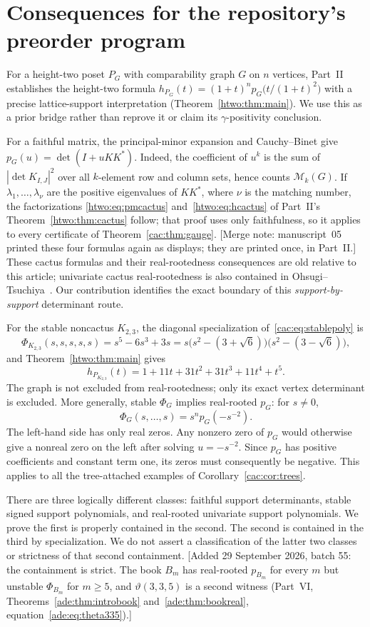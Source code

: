 \documentclass[11pt]{article}
\numberwithin{equation}{section}
\theoremstyle{definition}
\newcommand{\PM}{\mathcal M}
\begin{document}
\section{Consequences for the repository's preorder program}
\label{cac:sec:preorders}

For a height-two poset $P_G$ with comparability graph $G$ on $n$ vertices, Part~II establishes the height-two formula $h_{P_G}(t)=(1+t)^n p_G\bigl(t/(1+t)^2\bigr)$ with a precise lattice-support interpretation (Theorem~\ref{htwo:thm:main}). We use this as a prior bridge rather than reprove it or claim its $\gamma$-positivity conclusion.

For a faithful matrix, the principal-minor expansion and Cauchy--Binet give $p_G(u)=\det(I+uKK^*)$. Indeed, the coefficient of $u^k$ is the sum of $|\det K_{I,J}|^2$ over all $k$-element row and column sets, hence counts $\PM_k(G)$. If $\lambda_1,\ldots,\lambda_\nu$ are the positive eigenvalues of $KK^*$, where $\nu$ is the matching number, the factorizations \eqref{htwo:eq:pmcactus} and~\eqref{htwo:eq:hcactus} of Part~II's Theorem~\ref{htwo:thm:cactus} follow; that proof uses only faithfulness, so it applies to every certificate of Theorem~\ref{cac:thm:gauge}. [Merge note: manuscript~05 printed these four formulas again as displays; they are printed once, in Part~II.] These cactus formulas and their real-rootedness consequences are old relative to this article; univariate cactus real-rootedness is also contained in Ohsugi--Tsuchiya~\cite[Theorem 7.2]{OT21}. Our contribution identifies the exact boundary of this \emph{support-by-support} determinant route.

For the stable noncactus $K_{2,3}$, the diagonal specialization of~\eqref{cac:eq:stablepoly} is
\[
 \Phi_{K_{2,3}}(s,s,s,s,s)=s^5-6s^3+3s
 =s\bigl(s^2-(3+\sqrt6)\bigr)\bigl(s^2-(3-\sqrt6)\bigr),
\]
and Theorem~\ref{htwo:thm:main} gives
\[
 h_{P_{K_{2,3}}}(t)=1+11t+31t^2+31t^3+11t^4+t^5.
\]
The graph is not excluded from real-rootedness; only its exact vertex determinant is excluded. More generally, stable $\Phi_G$ implies real-rooted $p_G$: for $s\ne0$,
\[
 \Phi_G(s,\ldots,s)=s^n p_G(-s^{-2}).
\]
The left-hand side has only real zeros. Any nonzero zero of $p_G$ would otherwise give a nonreal zero on the left after solving $u=-s^{-2}$. Since $p_G$ has positive coefficients and constant term one, its zeros must consequently be negative. This applies to all the tree-attached examples of Corollary~\ref{cac:cor:trees}.

There are three logically different classes: faithful support determinants, stable signed support polynomials, and real-rooted univariate support polynomials. We prove the first is properly contained in the second. The second is contained in the third by specialization. We do not assert a classification of the latter two classes or strictness of that second containment. [Added 29 September 2026, batch 55: the containment is strict. The book $B_m$ has real-rooted $p_{B_m}$ for every $m$ but unstable $\Phi_{B_m}$ for $m\ge5$, and $\vartheta(3,3,5)$ is a second witness (Part~VI, Theorems~\ref{ade:thm:introbook} and~\ref{ade:thm:bookreal}, equation~\eqref{ade:eq:theta335}).]
\end{document}
